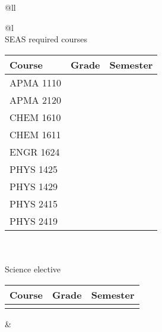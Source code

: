 \begin{figure*}
\begin{center}
\noindent\begin{tabular}{@{}ll}
\noindent\begin{tabular}{@{}l}
\\
SEAS required courses \\
\begin{tabular}{|p{1.2in}|l|l|}\hline
\bf Course & \bf Grade & \bf Semester \\ \hline \hline
APMA 1110 & & \\ \hline
APMA 2120 & & \\ \hline
CHEM 1610 & & \\ \hline
CHEM 1611 & & \\ \hline
ENGR 1624 & & \\ \hline
PHYS 1425 & & \\ \hline
PHYS 1429 & & \\ \hline
PHYS 2415 & & \\ \hline
PHYS 2419 & & \\ \hline
\end{tabular} \\
\\
Science elective \\
\begin{tabular}{|p{1.2in}|l|l|} \hline
\bf Course & \bf Grade & \bf Semester \\ \hline \hline
\hspace{0.7in} & & \\ \hline
\end{tabular}
\end{tabular}

&


\end{tabular}
\end{center}
\end{figure*}
